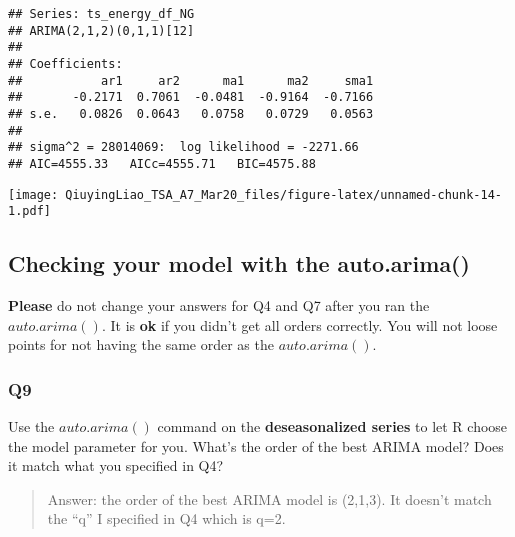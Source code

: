 \documentclass[
]{article}
\newenvironment{Shaded}{\begin{snugshade}}{\end{snugshade}}
\newcommand{\AttributeTok}[1]{\textcolor[rgb]{0.77,0.63,0.00}{#1}}
\newcommand{\CommentTok}[1]{\textcolor[rgb]{0.56,0.35,0.01}{\textit{#1}}}
\newcommand{\DecValTok}[1]{\textcolor[rgb]{0.00,0.00,0.81}{#1}}
\newcommand{\FunctionTok}[1]{\textcolor[rgb]{0.00,0.00,0.00}{#1}}
\newcommand{\NormalTok}[1]{#1}
\newcommand{\SpecialCharTok}[1]{\textcolor[rgb]{0.00,0.00,0.00}{#1}}
\begin{document}
\begin{verbatim}
## Series: ts_energy_df_NG 
## ARIMA(2,1,2)(0,1,1)[12] 
## 
## Coefficients:
##           ar1     ar2      ma1      ma2     sma1
##       -0.2171  0.7061  -0.0481  -0.9164  -0.7166
## s.e.   0.0826  0.0643   0.0758   0.0729   0.0563
## 
## sigma^2 = 28014069:  log likelihood = -2271.66
## AIC=4555.33   AICc=4555.71   BIC=4575.88
\end{verbatim}

\begin{Shaded}
\end{Shaded}

\texttt{[image: QiuyingLiao\_TSA\_A7\_Mar20\_files/figure-latex/unnamed-chunk-14-1.pdf]}

\hypertarget{checking-your-model-with-the-auto.arima}{%
\subsection{Checking your model with the
auto.arima()}\label{checking-your-model-with-the-auto.arima}}

\textbf{Please} do not change your answers for Q4 and Q7 after you ran
the \(auto.arima()\). It is \textbf{ok} if you didn't get all orders
correctly. You will not loose points for not having the same order as
the \(auto.arima()\).

\hypertarget{q9}{%
\subsubsection{Q9}\label{q9}}

Use the \(auto.arima()\) command on the \textbf{deseasonalized series}
to let R choose the model parameter for you. What's the order of the
best ARIMA model? Does it match what you specified in Q4?

\begin{quote}
Answer: the order of the best ARIMA model is (2,1,3). It doesn't match
the ``q'' I specified in Q4 which is q=2.
\end{quote}
\end{document}

